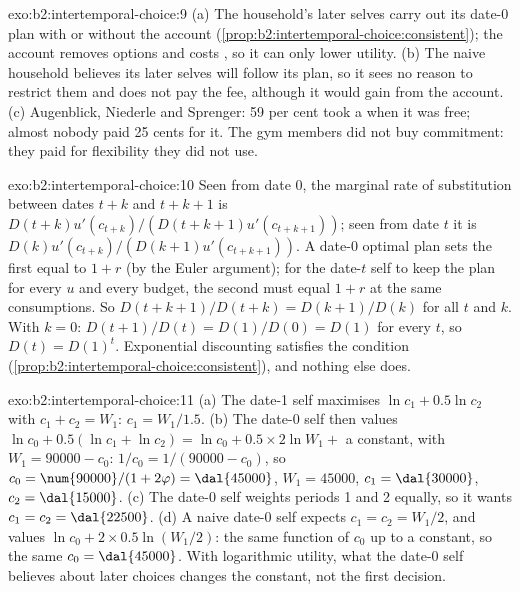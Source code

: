 \begin{solution}{exo:b2:intertemporal-choice:9}
(a) The household's later selves carry out its date-0 plan with or without the account
(\cref{prop:b2:intertemporal-choice:consistent}); the account removes options and costs , so
it can only lower utility. (b) The naive household believes its later selves will follow its plan, so
it sees no reason to restrict them and does not pay the fee, although it would gain from the account.
(c) Augenblick, Niederle and Sprenger: 59 per cent took a  when it was free; almost
nobody paid 25 cents for it. The gym members did not buy commitment: they paid for flexibility they
did not use.
\end{solution}

\begin{solution}{exo:b2:intertemporal-choice:10}
Seen from date 0, the marginal rate of substitution between dates $t + k$ and $t + k + 1$ is
$D(t + k)u'(c_{t+k})/(D(t + k + 1)u'(c_{t+k+1}))$; seen from date $t$ it is
$D(k)u'(c_{t+k})/(D(k + 1)u'(c_{t+k+1}))$. A date-0 optimal plan sets the first equal to $1 + r$ (by
the Euler argument); for the date-$t$ self to keep the plan for every $u$ and every budget, the second
must equal $1 + r$ at the same consumptions. So $D(t + k + 1)/D(t + k) = D(k + 1)/D(k)$ for all $t$ and
$k$. With $k = 0$: $D(t + 1)/D(t) = D(1)/D(0) = D(1)$ for every $t$, so $D(t) = D(1)^{t}$. Exponential
discounting satisfies the condition (\cref{prop:b2:intertemporal-choice:consistent}), and nothing else
does.
\end{solution}

\begin{solution}{exo:b2:intertemporal-choice:11}
(a) The date-1 self maximises $\ln c_1 + 0.5\ln c_2$ with $c_1 + c_2 = W_1$: $c_1 = W_1/1.5$.
(b) The date-0 self then values $\ln c_0 + 0.5(\ln c_1 + \ln c_2) = \ln c_0 + 0.5 \times 2\ln W_1 +$ a
constant, with $W_1 = \num{90000} - c_0$: $1/c_0 = 1/(\num{90000} - c_0)$, so $c_0 = \num{90000}/(1 +
2\varphi) = \dal{45000}$, $W_1 = \num{45000}$, $c_1 = \dal{30000}$, $c_2 = \dal{15000}$. (c) The date-0
self weights periods 1 and 2 equally, so it wants $c_1 = c_2 = \dal{22500}$. (d) A naive date-0 self
expects $c_1 = c_2 = W_1/2$, and values $\ln c_0 + 2 \times 0.5\ln(W_1/2)$: the same function of $c_0$
up to a constant, so the same $c_0 = \dal{45000}$. With logarithmic utility, what the date-0 self
believes about later choices changes the constant, not the first decision.
\end{solution}

